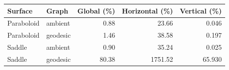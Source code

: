 \begin{tabular}{llrrr}
\toprule
Surface & Graph & Global (\%) & Horizontal (\%) & Vertical (\%)\\
\midrule
Paraboloid & ambient & 0.88 & 23.66 & 0.046\\
Paraboloid & geodesic & 1.46 & 38.58 & 0.197\\
Saddle & ambient & 0.90 & 35.24 & 0.025\\
Saddle & geodesic & 80.38 & 1751.52 & 65.930\\
\bottomrule
\end{tabular}
